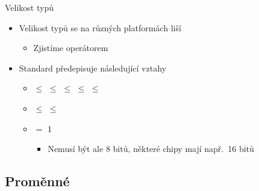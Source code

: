 \begin{frame}{Velikost typů}

  \begin{itemize}
    \item Velikost typů se na různých platformách liší
    \begin{itemize}
      \item Zjistíme operátorem 
    \end{itemize}

    \pause

    \item Standard předepisuje následující vztahy
    \begin{itemize}
      \item {} $\leq$  $\leq$
         $\leq$  $\leq$
	 $\leq$ 

      \pause

      \item {} $\leq$  $\leq$

      \pause

      \item {} $=$ 1
      \begin{itemize}
	\item Nemusí být ale 8 bitů, některé chipy mají např.\ 16 bitů
      \end{itemize}
    \end{itemize}
  \end{itemize}

\end{frame}

\subsection*{Proměnné}
\frame{\subsectionpage}

